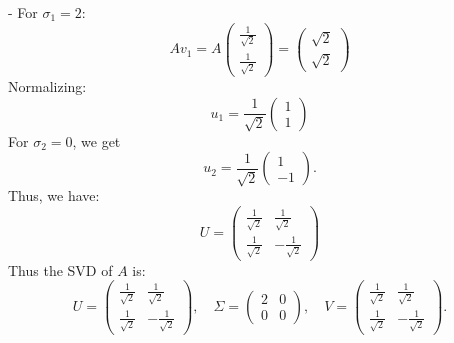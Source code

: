 \documentclass[lang=cn,11pt]{elegantbook}
\begin{document}
\begin{solution}
- For \( \sigma_1 = 2 \):
  \[
  A v_1 = A \begin{pmatrix} \frac{1}{\sqrt{2}} \\ \frac{1}{\sqrt{2}} \end{pmatrix}  = \begin{pmatrix}\sqrt{2}\\ \sqrt{2}\end{pmatrix}
  \]
Normalizing:
  \[
  u_1 = \frac{1}{\sqrt{2}} \begin{pmatrix}1\\ 1\end{pmatrix}
  \]For \( \sigma_2 = 0 \), we get
  \[
  u_2 = \frac{1}{\sqrt{2}} \begin{pmatrix}1\\ -1\end{pmatrix}.
  \]Thus, we have:
  \[
  U = \begin{pmatrix} \frac{1}{\sqrt{2}} & \frac{1}{\sqrt{2}} \\ \frac{1}{\sqrt{2}} & -\frac{1}{\sqrt{2}} \end{pmatrix}
  \]
Thus the SVD of \( A \) is:
\[
U = \begin{pmatrix} \frac{1}{\sqrt{2}} & \frac{1}{\sqrt{2}} \\ \frac{1}{\sqrt{2}} & -\frac{1}{\sqrt{2}} \end{pmatrix}, \quad
\Sigma = \begin{pmatrix}2 & 0\\ 0 & 0\end{pmatrix}, \quad
V = \begin{pmatrix} \frac{1}{\sqrt{2}} & \frac{1}{\sqrt{2}} \\ \frac{1}{\sqrt{2}} & -\frac{1}{\sqrt{2}} \end{pmatrix}.
\]
\end{solution}
\end{document}
